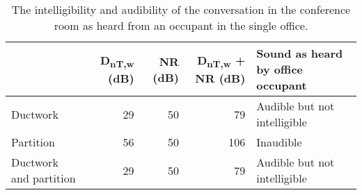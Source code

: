 \begin{table}[htbp]
	\caption{The intelligibility and audibility of the conversation in the conference room as heard from an occupant in the single office.}
	\label{tbl:privacy}
	\centering
	\begin{tabular}{@{}lrrrl@{}}
		\toprule
		& D\textsubscript{nT,w} (dB) & NR (dB) & D\textsubscript{nT,w} + NR (dB) & Sound as heard by office occupant \\ \midrule
		 Ductwork & 29 & 50 & 79 & Audible but not intelligible \\
		 Partition & 56 & 50 & 106 & Inaudible \\
		 Ductwork and partition & 29 & 50 & 79 & Audible but not intelligible \\ \bottomrule
	\end{tabular}
\end{table}